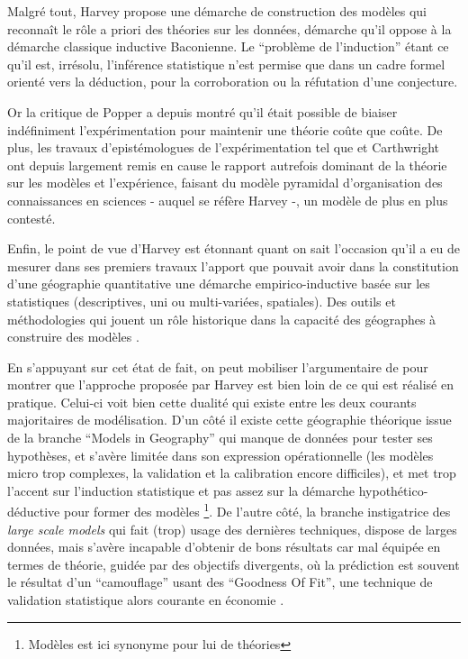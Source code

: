 Malgré tout, Harvey propose une démarche de construction des modèles qui reconnaît le rôle a priori des théories sur les données, démarche qu'il oppose à la démarche classique inductive Baconienne. Le \enquote{problème de l'induction} étant ce qu'il est, irrésolu, l'inférence statistique n'est permise que dans un cadre formel orienté vers la déduction, pour la corroboration ou la réfutation d'une conjecture.

Or la critique de Popper  a depuis montré qu'il était possible de biaiser indéfiniment l'expérimentation pour maintenir une théorie coûte que coûte. De plus, les travaux d'epistémologues de l'expérimentation tel que \textcite[348-351]{Hacking1989} et Carthwright ont depuis largement remis en cause le rapport autrefois dominant de la théorie sur les modèles et l'expérience, faisant du modèle pyramidal d'organisation des connaissances en sciences - auquel se réfère Harvey -, un modèle de plus en plus contesté.

Enfin, le point de vue d'Harvey est étonnant quant on sait l'occasion qu'il a eu de mesurer dans ses premiers travaux l'apport que pouvait avoir dans la constitution d'une géographie quantitative une démarche empirico-inductive basée sur les statistiques (descriptives, uni ou multi-variées, spatiales). Des outils et méthodologies qui jouent un rôle historique \autocite{Pumain2003,Pumain2002} dans la capacité des géographes à construire des modèles \autocite{Sanders2000, Cottineau2014b}.


En s'appuyant sur cet état de fait, on peut mobiliser l'argumentaire de \textcite{Wilson1972} pour montrer que l'approche proposée par Harvey est bien loin de ce qui est réalisé en pratique. Celui-ci voit bien cette dualité qui existe entre les deux courants majoritaires de modélisation. D'un côté il existe cette géographie théorique issue de la branche \foreignquote{english}{Models in Geography} qui manque de données pour tester ses hypothèses, et s'avère limitée dans son expression opérationnelle (les modèles micro trop complexes, la validation et la calibration encore difficiles), et met trop l'accent sur l'induction statistique et pas assez sur la démarche hypothético-déductive pour former des modèles \footnote{Modèles est ici synonyme pour lui de théories}. De l'autre côté, la branche instigatrice des \textit{large scale models} qui fait (trop) usage des dernières techniques, dispose de larges données, mais s'avère incapable d'obtenir de bons résultats car mal équipée en termes de théorie, guidée par des objectifs divergents, où la prédiction est souvent le résultat d'un \enquote{camouflage} usant des \foreignquote{english}{Goodness Of Fit}, une technique de validation statistique alors courante en économie \autocite[10]{Batty1994}.


